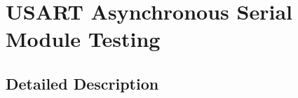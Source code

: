 \hypertarget{group__testing_u_s_a_r_t_module}{}\section{U\+S\+A\+R\+T Asynchronous Serial Module Testing}
\label{group__testing_u_s_a_r_t_module}


\subsection{Detailed Description}
